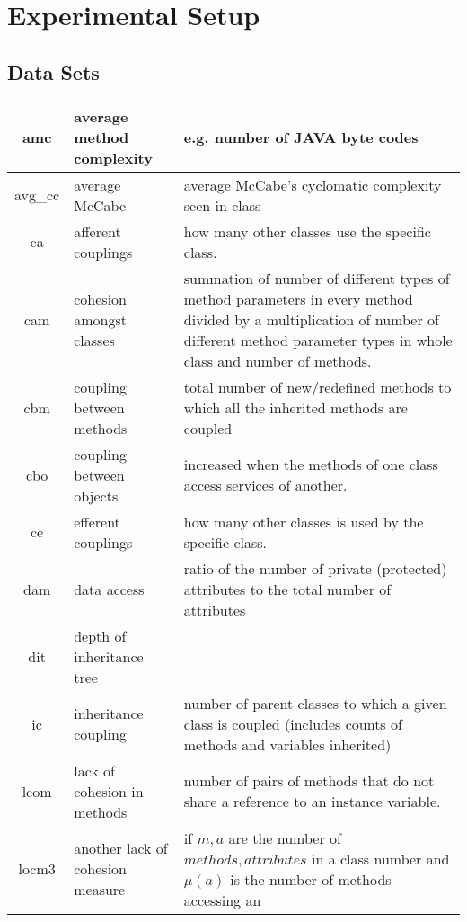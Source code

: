 \documentclass[12pt, journal, compsoc]{IEEEtran}
\begin{document}
\section{Experimental Setup}
\subsection{Data Sets}
\begin{figure*}[htbp!]
  \renewcommand{\baselinestretch}{1}\begin{center}
    {\scriptsize
      \begin{tabular}{c|l|p{4.7in}}
        amc & average method complexity & e.g. number of JAVA byte codes\\\hline
        avg\_cc & average McCabe & average McCabe's cyclomatic complexity seen
        in class\\\hline
        ca & afferent couplings & how many other classes use the specific
        class. \\\hline
        cam & cohesion amongst classes & summation of number of different
        types of method parameters in every method divided by a multiplication
        of number of different method parameter types in whole class and
        number of methods. \\\hline
        cbm &coupling between methods &  total number of new/redefined methods
        to which all the inherited methods are coupled\\\hline
        cbo & coupling between objects & increased when the methods of one
        class access services of another.\\\hline
        ce & efferent couplings & how many other classes is used by the
        specific class. \\\hline
        dam & data access & ratio of the number of private (protected)
        attributes to the total number of attributes\\\hline
        dit & depth of inheritance tree &\\\hline
        ic & inheritance coupling &  number of parent classes to which a given
        class is coupled (includes counts of methods and variables inherited)
        \\\hline
        lcom & lack of cohesion in methods &number of pairs of methods that do
        not share a reference to an instance variable.\\\hline
        locm3 & another lack of cohesion measure & if $m,a$ are  the number of
        $methods,attributes$
        in a class number and $\mu(a)$  is the number of methods accessing an

\end{tabular}}
\end{center}
\end{figure*}
\end{document}
